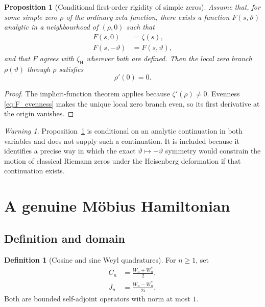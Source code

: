 \documentclass[11pt]{amsart}
\numberwithin{equation}{section}
\theoremstyle{plain}
\newtheorem{proposition}[theorem]{Proposition}
\theoremstyle{definition}
\newtheorem{definition}[theorem]{Definition}
\theoremstyle{remark}
\newtheorem{warning}[theorem]{Warning}
\begin{document}
\begin{proposition}[Conditional first-order rigidity of simple zeros]
\label{prop:conditional_zero_rigidity}
Assume that, for some simple zero $\rho$ of the ordinary zeta function,
there exists a function $F(s,\vartheta)$ analytic in a neighbourhood of
$(\rho,0)$ such that
\begin{align}
F(s,0)
&=\zeta(s),
\label{eq:F_classical_boundary}\\
F(s,-\vartheta)
&=F(s,\vartheta),
\label{eq:F_evenness}
\end{align}
and that $F$ agrees with $\zeta_{\mathrm H}$ wherever both are defined.
Then the local zero branch $\rho(\vartheta)$ through $\rho$ satisfies
\begin{equation}
\rho'(0)=0.
\label{eq:zero_first_derivative_zero}
\end{equation}
\end{proposition}

\begin{proof}
The implicit-function theorem applies because $\zeta'(\rho)\neq0$.
Evenness \eqref{eq:F_evenness} makes the unique local zero branch even, so
its first derivative at the origin vanishes.
\end{proof}

\begin{warning}
\label{warn:conditional_zero_result}
Proposition~\ref{prop:conditional_zero_rigidity} is conditional on an analytic
continuation in both variables and does not supply such a continuation.  It
is included because it identifies a precise way in which the exact
$\vartheta\mapsto-\vartheta$ symmetry would constrain the motion of classical
Riemann zeros under the Heisenberg deformation if that continuation exists.
\end{warning}

\section{A genuine M\"obius Hamiltonian}
\label{sec:dynamics}

\subsection{Definition and domain}
\label{subsec:hamiltonian_definition}

\begin{definition}[Cosine and sine Weyl quadratures]
\label{def:Weyl_quadratures}
For $n\ge1$, set
\begin{align}
C_n
&=\frac{W_n+W_n^*}{2},
\label{eq:Cn_definition}\\
J_n
&=\frac{W_n-W_n^*}{2i}.
\label{eq:Jn_definition}
\end{align}
Both are bounded self-adjoint operators with norm at most $1$.
\end{definition}
\end{document}
